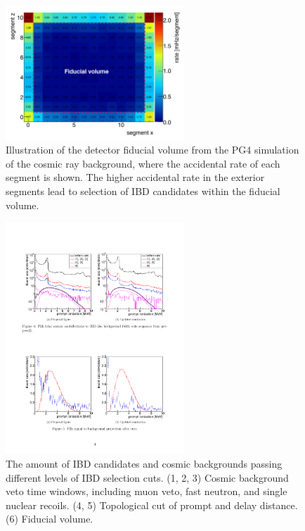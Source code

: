 \begin{figure}[h!]
    \centering
    \includegraphics[width=0.6\textwidth]{Figures/Fiducial.pdf}
    \caption[Illustration of the detector fiducial volume]{Illustration of the detector fiducial volume from the PG4 simulation of the cosmic ray background, where the accidental rate of each segment is shown. 
    The higher accidental rate in the exterior segments lead to selection of IBD candidates within the fiducial volume.}
    \label{fig:Fiducial}
\end{figure}

\begin{figure}[h!]
    \centering
    \includegraphics[width=0.6\textwidth]{Figures/IBDCuts.pdf}
    \caption[Different levels of IBD selection]{
    The amount of IBD candidates and cosmic backgrounds passing different levels of IBD selection cuts.
    (1, 2, 3) Cosmic background veto time windows, including muon veto, fast neutron, and single nuclear recoils.
    (4, 5) Topological cut of prompt and delay distance.
    (6) Fiducial volume.
    }
    \label{fig:IBDCuts}
\end{figure}

